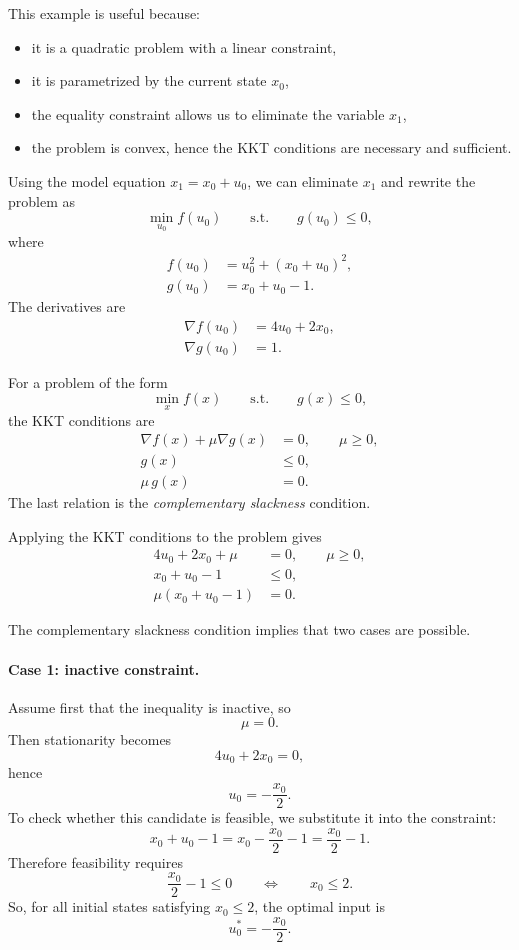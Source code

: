 This example is useful because:
\begin{itemize}
    \item it is a quadratic problem with a linear constraint,
    \item it is parametrized by the current state $x_0$,
    \item the equality constraint allows us to eliminate the variable $x_1$,
    \item the problem is convex, hence the KKT conditions are necessary and sufficient.
\end{itemize}
Using the model equation $x_1=x_0+u_0$, we can eliminate $x_1$ and rewrite the problem as
\[
\min_{u_0} f(u_0)
\qquad \text{s.t.} \qquad g(u_0)\le 0,
\]
where
\begin{align*}
f(u_0) &= u_0^2 + (x_0+u_0)^2, \\
g(u_0) &= x_0 + u_0 - 1.
\end{align*}
The derivatives are
\begin{align*}
\nabla f(u_0) &= 4u_0 + 2x_0, \\
\nabla g(u_0) &= 1.
\end{align*}

\begin{theorembox}
For a problem of the form
\[
\min_x f(x)
\qquad \text{s.t.}\qquad g(x)\le 0,
\]
the KKT conditions are
\begin{align*}
\nabla f(x)+\mu \nabla g(x) &= 0, \qquad \mu \ge 0,\\
g(x) &\le 0,\\
\mu\, g(x) &= 0.
\end{align*}
The last relation is the \emph{complementary slackness} condition.
\end{theorembox}

Applying the KKT conditions to the problem gives
\begin{align*}
4u_0 + 2x_0 + \mu &= 0, \qquad \mu \ge 0, \\
x_0 + u_0 - 1 &\le 0, \\
\mu(x_0 + u_0 - 1) &= 0.
\end{align*}

The complementary slackness condition implies that two cases are possible.

\paragraph{Case 1: inactive constraint.}
Assume first that the inequality is inactive, so
\[
\mu = 0.
\]
Then stationarity becomes
\[
4u_0 + 2x_0 = 0,
\]
hence
\[
u_0 = -\frac{x_0}{2}.
\]
To check whether this candidate is feasible, we substitute it into the constraint:
\[
x_0 + u_0 - 1 = x_0 - \frac{x_0}{2} - 1 = \frac{x_0}{2} - 1.
\]
Therefore feasibility requires
\[
\frac{x_0}{2} - 1 \le 0
\qquad \Longleftrightarrow \qquad
x_0 \le 2.
\]
So, for all initial states satisfying $x_0 \le 2$, the optimal input is
\[
u_0^* = -\frac{x_0}{2}.
\]

